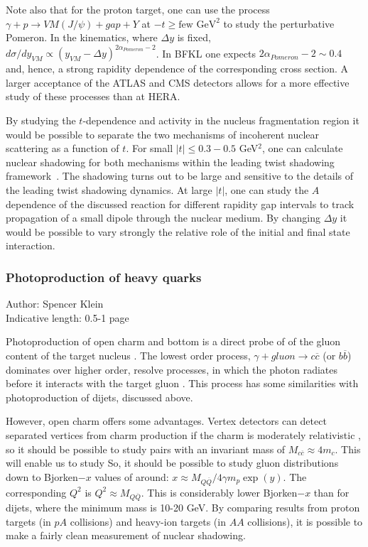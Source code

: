 \documentclass[../report.tex]{subfiles}
\begin{document}
Note also that for the proton target, one can use the process  $\gamma + p \to VM (J/\psi) + gap + Y$  at   
$-t \ge \mbox{few GeV}^2$ to study the perturbative Pomeron. 
In the kinematics, where $\Delta y$ is fixed, 
$d\sigma /dy_{VM} \propto (y_{VM}- \Delta y)^{2\alpha_{Pomeron}-2}$. In BFKL one expects
$2\alpha_{Pomeron}-2\sim 0.4$ and, hence, a strong rapidity dependence of the corresponding cross section. A larger acceptance of the ATLAS and CMS detectors allows for a more effective study of these processes than at HERA.


By studying the $t$-dependence and activity in the nucleus 
fragmentation region it would be possible to separate the two mechanisms of incoherent nuclear scattering as a function of $t$.
For small $|t| \le 0.3 - 0.5$ GeV$^2$, one can calculate nuclear shadowing for both mechanisms within the leading 
twist shadowing framework~\cite{Guzey:2013jaa}. The shadowing turns out to be large and sensitive to the details of the leading twist shadowing dynamics.  At large $|t|$, one can study the $A$ dependence of the discussed reaction for different rapidity gap  
intervals to track propagation of a small dipole through the nuclear medium.
 By changing $\Delta y$ it would be possible to vary  strongly the relative role of the initial and final state interaction.


\subsubsection{Photoproduction of heavy quarks}
Author: Spencer Klein\\
Indicative length: 0.5-1 page

Photoproduction of open charm and bottom is a direct probe of of the gluon content of the target nucleus \cite{Klein:2002wm,Goncalves:2017zdx}.  The lowest order process, $\gamma + gluon\rightarrow c \overline c$ (or $b \overline b$) dominates over higher order, resolve processes, in which the photon radiates before it interacts with the target gluon \cite{Klein:2002wm}.  This process has some similarities with photoproduction of dijets, discussed above.  

However, open charm offers some advantages.  Vertex detectors can detect separated vertices from charm production if the charm is moderately relativistic \cite{Bala:2012vg}, so it should be possible to study pairs with an invariant mass of $M_{c\overline c} \approx 4m_c$.  This will enable us to study  So, it should be possible to study gluon distributions down to Bjorken$-x$ values of around: $x \approx M_{Q\overline Q}/4\gamma m_p \exp(y)$.  The corresponding $Q^2$ is $Q^2 \approx M_{Q\overline Q}$.  This is considerably lower Bjorken$-x$ than for dijets, where the minimum mass is 10-20 GeV.  By comparing results from proton targets (in $pA$ collisions) and heavy-ion targets (in $AA$ collisions), it is possible to make a fairly clean measurement of nuclear shadowing.  
\end{document}
